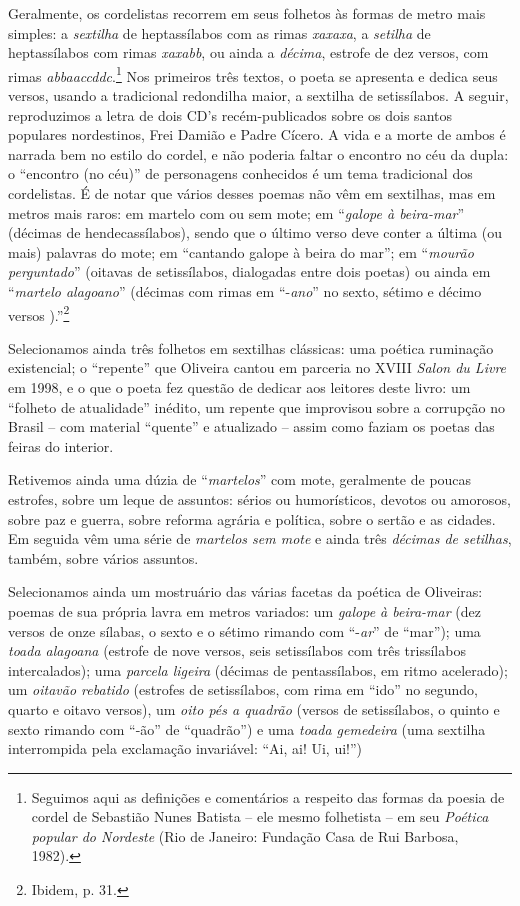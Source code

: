 Geralmente, os cordelistas recorrem em seus folhetos
às formas de metro mais simples: a \textit{sextilha} de heptassílabos
com as rimas \textit{xaxaxa}, a \textit{setilha} de heptassílabos com rimas
\textit{xaxabb}, ou ainda a \textit{décima}, estrofe de dez versos, com rimas
\textit{abbaaccddc}.\footnote{ Seguimos aqui as definições e comentários a
respeito das formas da poesia de cordel de Sebastião Nunes
Batista -- ele mesmo folhetista -- em seu \textit{Poética popular
do Nordeste} (Rio de Janeiro: Fundação Casa de Rui Barbosa, 1982).} Nos
primeiros três textos, o poeta se apresenta
e dedica seus versos, usando a tradicional redondilha maior,
a sextilha de setissílabos. A seguir, reproduzimos a letra de
dois CD's recém-publicados sobre os dois santos
populares nordestinos, Frei Damião e Padre Cícero. A vida e a morte
de ambos é narrada bem no estilo do cordel, e não poderia
faltar o encontro no céu da dupla: o ``encontro (no
céu)'' de personagens conhecidos é um tema tradicional dos
cordelistas. É de notar que vários desses poemas não vêm
em sextilhas, mas em metros mais raros: em martelo com
ou sem mote; em ``\textit{galope à beira-mar}''
(décimas de hendecassílabos), sendo que o último verso deve conter a
última (ou mais) palavras do mote; em ``cantando galope
à beira do mar''; em ``\textit{mourão
perguntado}'' (oitavas de
setissílabos, dialogadas entre dois poetas) ou ainda em
``\textit{martelo alagoano}'' (décimas com rimas em
``-\textit{ano}'' no sexto, sétimo e décimo versos ).''\footnote{ Ibidem, p. 31.}

Selecionamos ainda três folhetos em sextilhas clássicas:
uma poética ruminação existencial; o
``repente'' que Oliveira cantou em parceria no XVIII \textit{Salon du Livre} em
1998, e o que o poeta fez questão de dedicar aos leitores
deste livro: um ``folheto de atualidade''
inédito, um repente
que improvisou sobre a corrupção no Brasil -- com
material ``quente'' e atualizado -- assim como
faziam os poetas das feiras do interior.

Retivemos ainda uma dúzia de ``\textit{martelos}'' com
mote, geralmente de poucas estrofes, sobre um leque de assuntos:
sérios ou humorísticos, devotos ou amorosos, sobre paz e
guerra, sobre reforma agrária e política, sobre o sertão e as
cidades. Em seguida vêm uma série de \textit{martelos sem mote}
e ainda três \textit{décimas de setilhas}, também, sobre vários
assuntos.

Selecionamos ainda um mostruário das várias facetas
da poética de Oliveiras: poemas de sua própria lavra em
metros variados: um \textit{galope à beira-mar} (dez versos de onze
sílabas, o sexto e o sétimo rimando com
``-\textit{ar}'' de ``mar''); uma \textit{toada alagoana} (estrofe de nove versos, seis setissílabos
com três trissílabos intercalados); uma \textit{parcela ligeira}
(décimas de pentassílabos, em ritmo acelerado); um
\textit{oitavão rebatido} (estrofes de setissílabos, com rima em
``ido'' no segundo, quarto e oitavo versos),
um \textit{oito pés a
quadrão} (versos de setissílabos, o quinto e sexto rimando
com ``-ão'' de
``quadrão'') e uma \textit{toada gemedeira} (uma
sextilha interrompida pela exclamação invariável: ``Ai, ai!
Ui, ui!'')

